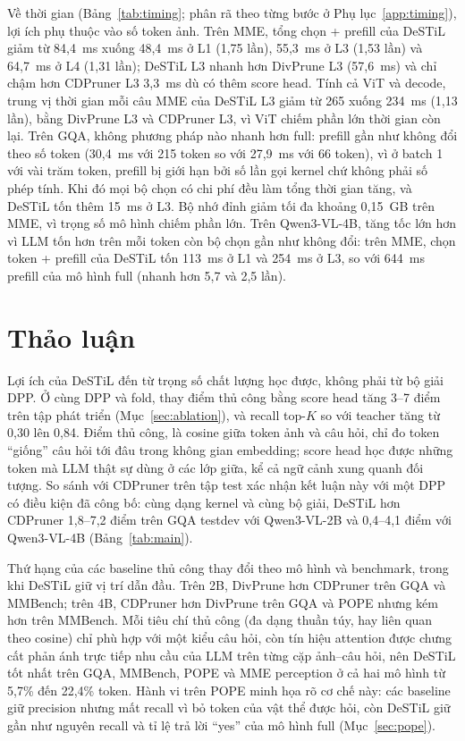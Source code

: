 \documentclass[conference]{IEEEtran}
\begin{document}
Về thời gian (Bảng~\ref{tab:timing}; phân rã theo từng bước ở Phụ lục~\ref{app:timing}), lợi ích phụ thuộc vào số token ảnh. Trên MME, tổng chọn + prefill của DeSTiL giảm từ 84,4~ms xuống 48,4~ms ở L1 (1,75 lần), 55,3~ms ở L3 (1,53 lần) và 64,7~ms ở L4 (1,31 lần); DeSTiL L3 nhanh hơn DivPrune L3 (57,6~ms) và chỉ chậm hơn CDPruner L3 3,3~ms dù có thêm score head. Tính cả ViT và decode, trung vị thời gian mỗi câu MME của DeSTiL L3 giảm từ 265 xuống 234~ms (1,13 lần), bằng DivPrune L3 và CDPruner L3, vì ViT chiếm phần lớn thời gian còn lại. Trên GQA, không phương pháp nào nhanh hơn full: prefill gần như không đổi theo số token (30,4~ms với 215 token so với 27,9~ms với 66 token), vì ở batch 1 với vài trăm token, prefill bị giới hạn bởi số lần gọi kernel chứ không phải số phép tính. Khi đó mọi bộ chọn có chi phí đều làm tổng thời gian tăng, và DeSTiL tốn thêm 15~ms ở L3. Bộ nhớ đỉnh giảm tối đa khoảng 0,15~GB trên MME, vì trọng số mô hình chiếm phần lớn. Trên Qwen3-VL-4B, tăng tốc lớn hơn vì LLM tốn hơn trên mỗi token còn bộ chọn gần như không đổi: trên MME, chọn token + prefill của DeSTiL tốn 113~ms ở L1 và 254~ms ở L3, so với 644~ms prefill của mô hình full (nhanh hơn 5,7 và 2,5 lần).

\section{Thảo luận}
\label{sec:discussion}
Lợi ích của DeSTiL đến từ trọng số chất lượng học được, không phải từ bộ giải DPP. Ở cùng DPP và fold, thay điểm thủ công bằng score head tăng 3--7 điểm trên tập phát triển (Mục~\ref{sec:ablation}), và recall top-$K$ so với teacher tăng từ 0,30 lên 0,84. Điểm thủ công, là cosine giữa token ảnh và câu hỏi, chỉ đo token ``giống'' câu hỏi tới đâu trong không gian embedding; score head học được những token mà LLM thật sự dùng ở các lớp giữa, kể cả ngữ cảnh xung quanh đối tượng. So sánh với CDPruner trên tập test xác nhận kết luận này với một DPP có điều kiện đã công bố: cùng dạng kernel và cùng bộ giải, DeSTiL hơn CDPruner 1,8--7,2 điểm trên GQA testdev với Qwen3-VL-2B và 0,4--4,1 điểm với Qwen3-VL-4B (Bảng~\ref{tab:main}).

Thứ hạng của các baseline thủ công thay đổi theo mô hình và benchmark, trong khi DeSTiL giữ vị trí dẫn đầu. Trên 2B, DivPrune hơn CDPruner trên GQA và MMBench; trên 4B, CDPruner hơn DivPrune trên GQA và POPE nhưng kém hơn trên MMBench. Mỗi tiêu chí thủ công (đa dạng thuần túy, hay liên quan theo cosine) chỉ phù hợp với một kiểu câu hỏi, còn tín hiệu attention được chưng cất phản ánh trực tiếp nhu cầu của LLM trên từng cặp ảnh--câu hỏi, nên DeSTiL tốt nhất trên GQA, MMBench, POPE và MME perception ở cả hai mô hình từ 5,7\% đến 22,4\% token. Hành vi trên POPE minh họa rõ cơ chế này: các baseline giữ precision nhưng mất recall vì bỏ token của vật thể được hỏi, còn DeSTiL giữ gần như nguyên recall và tỉ lệ trả lời ``yes'' của mô hình full (Mục~\ref{sec:pope}).
\end{document}
